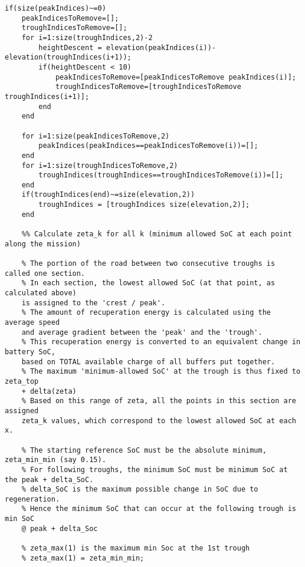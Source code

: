 \documentclass[ExampleMasters.tex]{subfiles}
\begin{document}
\begin{verbatim}
if(size(peakIndices)~=0)
    peakIndicesToRemove=[];
    troughIndicesToRemove=[];
    for i=1:size(troughIndices,2)-2
        heightDescent = elevation(peakIndices(i))-elevation(troughIndices(i+1));
        if(heightDescent < 10)
            peakIndicesToRemove=[peakIndicesToRemove peakIndices(i)];
            troughIndicesToRemove=[troughIndicesToRemove troughIndices(i+1)];
        end
    end
                  
    for i=1:size(peakIndicesToRemove,2)
        peakIndices(peakIndices==peakIndicesToRemove(i))=[];
    end
    for i=1:size(troughIndicesToRemove,2)
        troughIndices(troughIndices==troughIndicesToRemove(i))=[];
    end
    if(troughIndices(end)~=size(elevation,2))
        troughIndices = [troughIndices size(elevation,2)];
    end
    
    %% Calculate zeta_k for all k (minimum allowed SoC at each point along the mission)
    
    % The portion of the road between two consecutive troughs is called one section.
    % In each section, the lowest allowed SoC (at that point, as calculated above) 
    is assigned to the 'crest / peak'.
    % The amount of recuperation energy is calculated using the average speed
    and average gradient between the 'peak' and the 'trough'.
    % This recuperation energy is converted to an equivalent change in battery SoC, 
    based on TOTAL available charge of all buffers put together.
    % The maximum 'minimum-allowed SoC' at the trough is thus fixed to zeta_top 
    + delta(zeta)
    % Based on this range of zeta, all the points in this section are assigned
    zeta_k values, which correspond to the lowest allowed SoC at each x.
    
    % The starting reference SoC must be the absolute minimum, zeta_min_min (say 0.15).
    % For following troughs, the minimum SoC must be minimum SoC at the peak + delta_SoC.
    % delta_SoC is the maximum possible change in SoC due to regeneration.
    % Hence the minimum SoC that can occur at the following trough is min SoC 
    @ peak + delta_Soc
    
    % zeta_max(1) is the maximum min Soc at the 1st trough
    % zeta_max(1) = zeta_min_min;


\end{verbatim}
\end{document}
